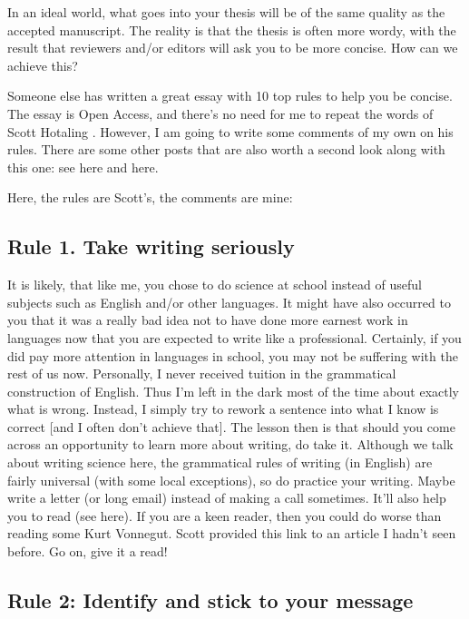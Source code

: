 \documentclass[
]{krantz}
\begin{document}
In an ideal world, what goes into your thesis will be of the same quality as the accepted manuscript. The reality is that the thesis is often more wordy, with the result that reviewers and/or editors will ask you to be more concise. How can we achieve this?

Someone else has written a great essay with 10 top rules to help you be concise. The essay is Open Access, and there's no need for me to repeat the words of Scott Hotaling \citeyearpar{hotaling2020simple}. However, I am going to write some comments of my own on his rules. There are some other posts that are also worth a second look along with this one: see here and here.

Here, the rules are Scott's, the comments are mine:

\hypertarget{rule-1.-take-writing-seriously}{%
\subsection{Rule 1. Take writing seriously}\label{rule-1.-take-writing-seriously}}

It is likely, that like me, you chose to do science at school instead of useful subjects such as English and/or other languages. It might have also occurred to you that it was a really bad idea not to have done more earnest work in languages now that you are expected to write like a professional. Certainly, if you did pay more attention in languages in school, you may not be suffering with the rest of us now. Personally, I never received tuition in the grammatical construction of English. Thus I'm left in the dark most of the time about exactly what is wrong. Instead, I simply try to rework a sentence into what I know is correct {[}and I often don't achieve that{]}. The lesson then is that should you come across an opportunity to learn more about writing, do take it.
Although we talk about writing science here, the grammatical rules of writing (in English) are fairly universal (with some local exceptions), so do practice your writing. Maybe write a letter (or long email) instead of making a call sometimes. It'll also help you to read (see here). If you are a keen reader, then you could do worse than reading some Kurt Vonnegut. Scott provided this link to an article I hadn't seen before. Go on, give it a read!

\hypertarget{rule-2-identify-and-stick-to-your-message}{%
\subsection{Rule 2: Identify and stick to your message}\label{rule-2-identify-and-stick-to-your-message}}
\end{document}

